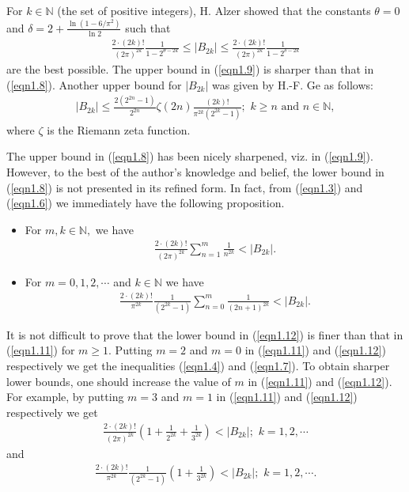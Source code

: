 \documentclass[eqnumis, pdf]{yjb}
\begin{document}
For $ k \in \mathbb{N} $ (the set of positive integers), H. Alzer \cite{alzer} showed that the constants $ \theta = 0 $ and $ \delta = 2 + \frac{\ln(1-6/\pi^2)}{\ln 2} $ such that 
\begin{align}\label{eqn1.9}
\frac{2 \cdot (2k)!}{(2\pi)^{2k}} \frac{1}{1-2^{\theta - 2k}} \leq \vert B_{2k} \vert \leq \frac{2 \cdot (2k)!}{(2\pi)^{2k}} \frac{1}{1-2^{\delta - 2k}}
\end{align}
are the best possible. The upper bound in (\ref{eqn1.9}) is sharper than that in (\ref{eqn1.8}). Another upper bound for $ \vert B_{2k} \vert $ was given by H.-F. Ge \cite{ge} as follows:
\begin{align}\label{eqn1.10}
\vert B_{2k} \vert \leq \frac{2(2^{2n}-1)}{2^{2n}} \zeta(2n) \frac{(2k)!}{\pi^{2k}(2^{2k}-1)}; \, \,  k \geq n \, \, \text{and} \, \, n \in \mathbb{N},
\end{align}
where $ \zeta $ is the Riemann zeta function.

 The upper bound in (\ref{eqn1.8}) has been nicely sharpened, viz. in (\ref{eqn1.9}). However, to the best of the author's knowledge and belief, the lower bound in (\ref{eqn1.8}) is not presented in its refined form. In fact, from (\ref{eqn1.3}) and (\ref{eqn1.6}) we immediately have the following proposition.
\begin{proposition}\label{prop1.1}
\begin{itemize}
\item[(i)] For $ m, k \in \mathbb{N}, $ we have
\begin{align}\label{eqn1.11}
\frac{ 2 \cdot (2k)!}{(2\pi)^{2k}} \sum_{n=1}^m \frac{1}{n^{2k}} < \vert B_{2k} \vert.
\end{align} 
\item[(ii)] For $ m = 0, 1, 2, \cdots $ and $ k \in \mathbb{N} $ we have 
\begin{align}\label{eqn1.12}
\frac{2 \cdot (2k)!}{\pi^{2k}} \frac{1}{(2^{2k}-1)}\sum_{n=0}^m \frac{1}{(2n+1)^{2k}} <  \vert B_{2k} \vert.
\end{align}
\end{itemize} 
\end{proposition}  
It is not difficult to prove that the lower bound in (\ref{eqn1.12}) is finer than that in (\ref{eqn1.11}) for $ m \geq 1. $ Putting $ m = 2 $ and $ m = 0 $ in (\ref{eqn1.11}) and (\ref{eqn1.12}) respectively we get the inequalities (\ref{eqn1.4}) and (\ref{eqn1.7}). To obtain sharper lower bounds, one should increase the value of $ m $ in (\ref{eqn1.11}) and (\ref{eqn1.12}). For example, by putting $ m=3 $ and $ m = 1$ in (\ref{eqn1.11}) and (\ref{eqn1.12}) respectively we get
\begin{align}\label{eqn1.13}
\frac{ 2 \cdot (2k)!}{(2\pi)^{2k}} \left(1 + \frac{1}{2^{2k}} + \frac{1}{3^{2k}}\right) < \vert B_{2k} \vert ; \, \, k = 1, 2, \cdots
\end{align}
and 
\begin{align}\label{eqn1.14}
\frac{2 \cdot (2k)!}{\pi^{2k}} \frac{1}{(2^{2k}-1)} \left( 1 + \frac{1}{3^{2k}} \right) <  \vert B_{2k} \vert ; \, \, k = 1, 2, \cdots.
\end{align}
\end{document}
